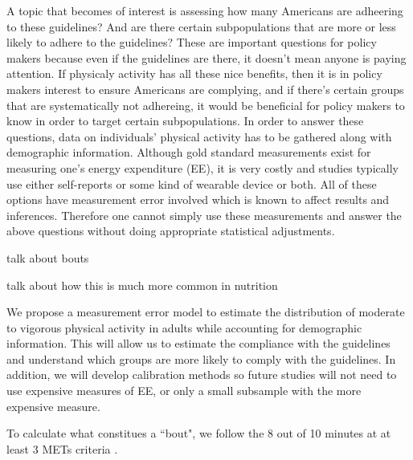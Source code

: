 \documentclass[11pt]{article}\usepackage[]{graphicx}\usepackage[]{color}
\begin{document}
A topic that becomes of interest is assessing how many Americans are adheering to these guidelines? And are there certain subpopulations that are more or less likely to adhere to the guidelines? These are important questions for policy makers because even if the guidelines are there, it doesn't mean anyone is paying attention. If physicaly activity has all these nice benefits, then it is in policy makers interest to ensure Americans are complying, and if there's certain groups that are systematically not adhereing, it would be beneficial for policy makers to know in order to target certain subpopulations.  In order to answer these questions, data on individuals' physical activity has to be gathered along with demographic information. Although gold standard measurements exist for measuring one's energy expenditure (EE), it is very costly and studies typically use either self-reports or some kind of wearable device or both. All of these options have measurement error involved which is known to affect results and inferences. Therefore one cannot simply use these measurements and answer the above questions without doing appropriate statistical adjustments. 


talk about bouts

talk about how this is much more common in nutrition

We propose a measurement error model to estimate the distribution of moderate to vigorous physical activity in adults while accounting for demographic information. This will allow us to estimate the compliance with the guidelines and understand which groups are more likely to comply with the guidelines. In addition, we will develop calibration methods so future studies will not need to use expensive measures of EE, or only a small subsample with the more expensive measure. 


To calculate what constitues a ``bout", we follow the 8 out of 10 minutes at at least 3 METs criteria \cite{kim}.

\clearpage
\end{document}
